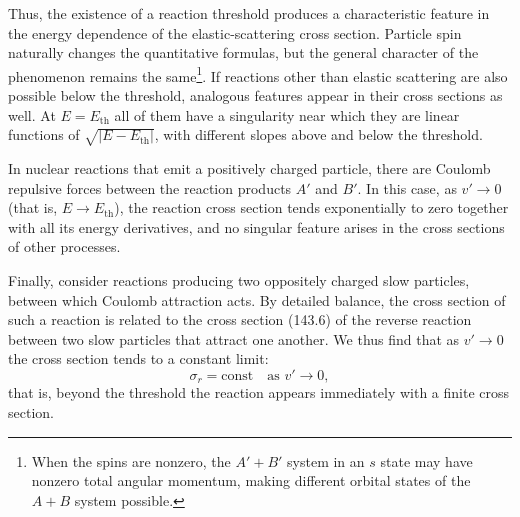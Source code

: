 Thus, the existence of a reaction threshold produces a characteristic feature in the energy dependence of the elastic-scattering cross section. Particle spin naturally changes the quantitative formulas, but the general character of the phenomenon remains the same\footnote{When the spins are nonzero, the $A'+B'$ system in an $s$ state may have nonzero total angular momentum, making different orbital states of the $A+B$ system possible.}. If reactions other than elastic scattering are also possible below the threshold, analogous features appear in their cross sections as well. At $E=E_{\mathrm{th}}$ all of them have a singularity near which they are linear functions of $\sqrt{|E-E_{\mathrm{th}}|}$, with different slopes above and below the threshold.

\begin{figure}[tbp]
\centering
{}
\caption{}
\end{figure}

In nuclear reactions that emit a positively charged particle, there are Coulomb repulsive forces between the reaction products $A'$ and $B'$. In this case, as $v'\to0$ (that is, $E\to E_{\mathrm{th}}$), the reaction cross section tends exponentially to zero together with all its energy derivatives, and no singular feature arises in the cross sections of other processes.

Finally, consider reactions producing two oppositely charged slow particles, between which Coulomb attraction acts. By detailed balance, the cross section of such a reaction is related to the cross section (143.6) of the reverse reaction between two slow particles that attract one another. We thus find that as $v'\to0$ the cross section tends to a constant limit:
\begin{equation}
 \sigma_r=\mathrm{const}\quad\text{as }v'\to0,
 \tag{147.11}
\end{equation}
that is, beyond the threshold the reaction appears immediately with a finite cross section.

